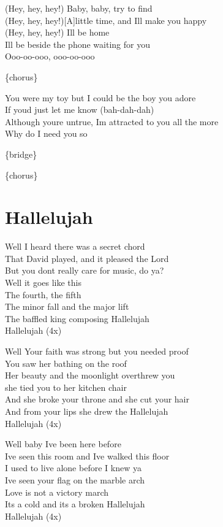 \documentclass[
  letterpaper,
]{scrbook}
\begin{document}
(Hey, hey, hey!) Baby, baby, try to find\\
(Hey, hey, hey!){[}A{]}little time, and I\textquotesingle ll make you
happy\\
(Hey, hey, hey!) I\textquotesingle ll be home\\
I\textquotesingle ll be beside the phone waiting for you\\
Ooo-oo-ooo, ooo-oo-ooo

\{chorus\}

You were my toy but I could be the boy you adore\\
If you\textquotesingle d just let me know (bah-dah-dah)\\
Although you\textquotesingle re untrue, I\textquotesingle m attracted to
you all the more\\
Why do I need you so

\{bridge\}

\{chorus\}

\hypertarget{hallelujah}{%
\chapter{Hallelujah}\label{hallelujah}}

Well I heard there was a secret chord\\
That David played, and it pleased the Lord\\
But you don\textquotesingle t really care for music, do ya?\\
Well it goes like this\\
The fourth, the fifth\\
The minor fall and the major lift\\
The baffled king composing Hallelujah\\
Hallelujah (4x)

Well Your faith was strong but you needed proof\\
You saw her bathing on the roof\\
Her beauty and the moonlight overthrew you\\
she tied you to her kitchen chair\\
And she broke your throne and she cut your hair\\
And from your lips she drew the Hallelujah\\
Hallelujah (4x)

Well baby I\textquotesingle ve been here before\\
I\textquotesingle ve seen this room and I\textquotesingle ve walked this
floor\\
I used to live alone before I knew ya\\
I\textquotesingle ve seen your flag on the marble arch\\
Love is not a victory march\\
It\textquotesingle s a cold and it\textquotesingle s a broken
Hallelujah\\
Hallelujah (4x)
\end{document}

